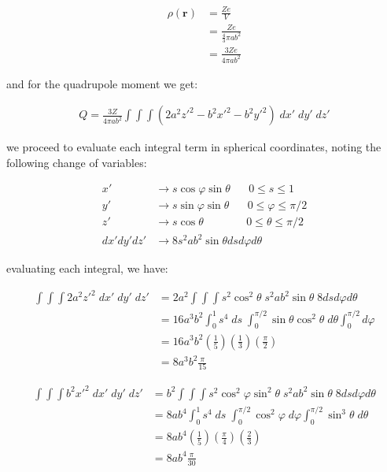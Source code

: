 \documentclass[11pt]{article}
\theoremstyle{definition}
\begin{document}
\begin{align*}
    \rho(\mathbf{r}) &= \frac{Ze}{V}\\
                     &= \frac{Ze}{\frac{4}{3}\pi ab^2}\\
                    &= \frac{3Ze}{4\pi ab^2}
\end{align*}

and for the quadrupole moment we get:

\begin{align*}
    Q = \frac{3Z}{4\pi ab^2}\int \int \int (2a^2z'^2 - b^2x'^2 - b^2y'^2) \; dx'\; dy'\; dz' \tag*{(8.32.3)}
\end{align*}

we proceed to evaluate each integral term in spherical coordinates, noting the following change of variables:

\begin{align*}
    x' &\to s \cos\varphi \sin\theta \;\;\;\;\;\; 0\leq s \leq 1\\
    y' &\to s \sin\varphi \sin\theta \;\;\;\;\;\; 0\leq \varphi \leq \pi/2\\
    z' &\to s \cos\theta \;\;\;\;\;\;\;\;\;\;\;\;\;\; 0 \leq \theta \leq \pi/2  \\
    dx'dy'dz' &\to 8s^2 ab^2 \sin\theta ds d\varphi d\theta
\end{align*}

evaluating each integral, we have:

\begin{align*}
    \int \int \int 2a^2z'^2 \; dx'\; dy'\; dz' &= 2a^2 \int\int\int s^2 \cos^2\theta \; s^2 ab^2 \sin\theta\;  8ds d\varphi d\theta\\
    &= 16a^3 b^2 \int_{0}^{1}s^4\; ds \; \int_{0}^{\pi/2} \sin\theta \cos^2\theta \; d\theta \int_{0}^{\pi/2} d\varphi\\
    &= 16a^3 b^2 \left( \frac{1}{5} \right) \left(\frac{1}{3}\right) \left(\frac{\pi}{2}\right)\\
    &= 8a^3 b^2\frac{\pi}{15}
 \end{align*}

\begin{align*}
    \int\int\int b^2x'^2 \; dx'\; dy'\; dz' &= b^2 \int\int\int s^2\cos^2\varphi \sin^2\theta \; s^2 ab^2 \sin\theta\;  8ds d\varphi d\theta\\
    &= 8ab^4 \int_{0}^{1}s^4\; ds \;  \int_{0}^{\pi/2} \cos^2\varphi \; d\varphi \int_{0}^{\pi/2} \sin^3\theta \; d\theta\\
    &= 8ab^4 \left(\frac{1}{5}\right) \left(\frac{\pi}{4}\right) \left(\frac{2}{3}\right)\\
    &= 8ab^4 \frac{\pi}{30}
\end{align*}
\end{document}
